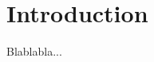 % 			 
%
%

\chapter{Introduction}
\setcounter{page}{1}
\label{introduction}

Blablabla...
\cite{kulmer2017using}